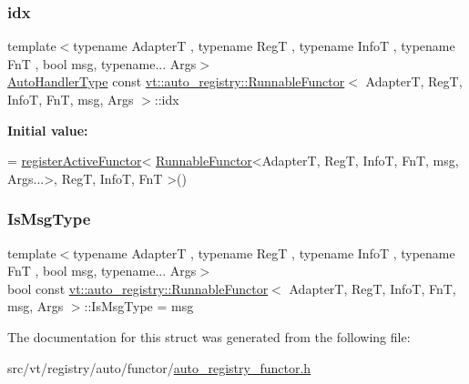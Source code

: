 \subsubsection{\texorpdfstring{idx}{idx}}
{\footnotesize\ttfamily template$<$typename AdapterT , typename RegT , typename InfoT , typename FnT , bool msg, typename... Args$>$ \\
\hyperlink{namespacevt_1_1auto__registry_ae295e18699146815bb7d7674594d95d7}{Auto\+Handler\+Type} const \hyperlink{structvt_1_1auto__registry_1_1_runnable_functor}{vt\+::auto\+\_\+registry\+::\+Runnable\+Functor}$<$ AdapterT, RegT, InfoT, FnT, msg, Args $>$\+::idx\hspace{0.3cm}{\ttfamily [static]}}

{\bfseries Initial value\+:}
\begin{DoxyCode}
=
  \hyperlink{namespacevt_1_1auto__registry_ab7e130e8790e4df4dc1d35476d1736e0}{registerActiveFunctor}<
    \hyperlink{structvt_1_1auto__registry_1_1_runnable_functor_a4dee5a83ee53d3f6a309d28091cfd6ff}{RunnableFunctor}<AdapterT, RegT, InfoT, FnT, msg, Args...>,
    RegT, InfoT, FnT
  >()
\end{DoxyCode}
\mbox{\label{structvt_1_1auto__registry_1_1_runnable_functor_a72e7d2e928c18ad46ee64f73c5dae509}} 
\subsubsection{\texorpdfstring{Is\+Msg\+Type}{IsMsgType}}
{\footnotesize\ttfamily template$<$typename AdapterT , typename RegT , typename InfoT , typename FnT , bool msg, typename... Args$>$ \\
bool const \hyperlink{structvt_1_1auto__registry_1_1_runnable_functor}{vt\+::auto\+\_\+registry\+::\+Runnable\+Functor}$<$ AdapterT, RegT, InfoT, FnT, msg, Args $>$\+::Is\+Msg\+Type = msg\hspace{0.3cm}{\ttfamily [static]}}



The documentation for this struct was generated from the following file\+:\begin{DoxyCompactItemize}
\item 
src/vt/registry/auto/functor/\hyperlink{auto__registry__functor_8h}{auto\+\_\+registry\+\_\+functor.\+h}\end{DoxyCompactItemize}
